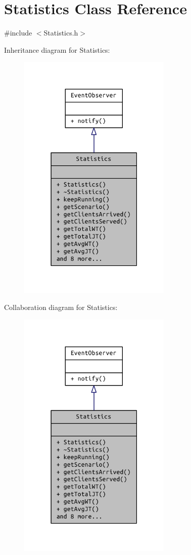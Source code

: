 \hypertarget{class_statistics}{}\section{Statistics Class Reference}
\label{class_statistics}


{\ttfamily \#include $<$Statistics.\+h$>$}



Inheritance diagram for Statistics\+:
\nopagebreak
\begin{figure}[H]
\begin{center}
\leavevmode
\includegraphics[width=207pt]{class_statistics__inherit__graph}
\end{center}
\end{figure}


Collaboration diagram for Statistics\+:
\nopagebreak
\begin{figure}[H]
\begin{center}
\leavevmode
\includegraphics[width=207pt]{class_statistics__coll__graph}
\end{center}
\end{figure}
